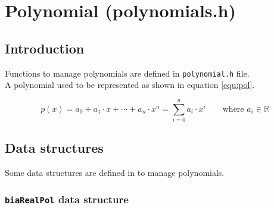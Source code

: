 %
%

\chapter{Polynomial (polynomials.h)} \label{sec:polynomial}

\section{Introduction}

Functions to manage polynomials are defined in \texttt{polynomial.h} file.\\

A polynomial used to be represented as shown in equation \ref{equ:pol}.

\begin{equation} \label{equ:pol}
p(x) = a_0 + a_1 \cdot x + \cdots + a_n \cdot x^n = \sum_{i=0}^n a_i \cdot x^i \qquad \textrm{where } a_i \in \mathbb{R}
\end{equation}

\section{Data structures}

Some data structures are defined in \BI to manage polynomials.

\subsection{\texttt{biaRealPol} data structure} \label{sec:biaRealPol}

